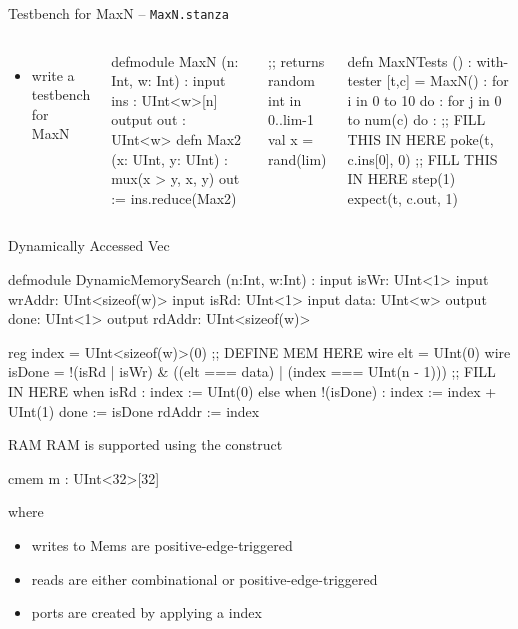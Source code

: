 \documentclass[xcolor=pdflatex,dvipsnames,table]{beamer}
\begin{document}
\begin{frame}[fragile]{Testbench for MaxN -- \tt MaxN.stanza}
\begin{columns}

\begin{itemize}
\item write a testbench for MaxN
\end{itemize}

{
\begin{stanza}
defmodule MaxN (n: Int, w: Int) :
  input ins : UInt<w>[n]
  output out : UInt<w>
  defn Max2 (x: UInt, y: UInt) :
    mux(x > y, x, y)
  out := ins.reduce(Max2)
\end{stanza}
}
\begin{stanza}
;; returns random int in 0..lim-1
val x = rand(lim) 
\end{stanza}


{
\begin{stanza}
defn MaxNTests () :
  with-tester [t,c] = MaxN() :
    for i in 0 to 10 do :
      for j in 0 to num(c) do :
        ;; FILL THIS IN HERE
        poke(t, c.ins[0], 0)
      ;; FILL THIS IN HERE
      step(1)
      expect(t, c.out, 1)
\end{stanza}
}
\end{columns}
\end{frame}

\begin{frame}[fragile]{Dynamically Accessed Vec}
\begin{stanza}
defmodule DynamicMemorySearch (n:Int, w:Int) :
  input  isWr:   UInt<1>
  input  wrAddr: UInt<sizeof(w)>
  input  isRd:   UInt<1>
  input  data:   UInt<w>
  output done:   UInt<1>
  output rdAddr: UInt<sizeof(w)>

  reg index = UInt<sizeof(w)>(0)
  ;; DEFINE MEM HERE
  wire elt  = UInt(0)
  wire isDone = !(isRd | isWr) & ((elt === data) | (index === UInt(n - 1)))
  ;; FILL IN HERE
  when isRd :
    index := UInt(0)
  else when !(isDone) :
    index := index + UInt(1)
  done    := isDone
  rdAddr  := index
\end{stanza}
\end{frame}

\begin{frame}[fragile]{RAM}
RAM is supported using the  construct

\begin{stanza}
cmem m : UInt<32>[32]
\end{stanza}

\noindent
where
\begin{itemize}
\item writes to Mems are positive-edge-triggered
\item reads are either combinational or positive-edge-triggered
\item ports are created by applying a  index
\end{itemize}
\end{frame}
\end{document}

